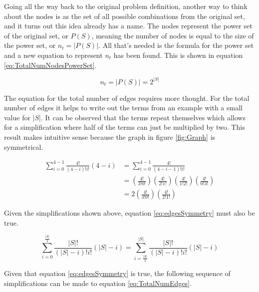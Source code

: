 \documentclass{article}
\begin{document}
Going all the way back to the original problem definition, another way to think about the nodes is as the set of all possible combinations from the original set, and it turns out this idea already has a name. The nodes represent the power set of the original set, or $P(S)$, meaning the number of nodes is equal to the size of the power set, or $n_t=|P(S)|$. All that's needed is the formula for the power set and a new equation to represent $n_t$ has been found. This is shown in equation \ref{eq:TotalNumNodesPowerSet}.

\begin{equation}
    n_t=|P(S)|=2^{|S|}
    \label{eq:TotalNumNodesPowerSet}
\end{equation}

The equation for the total number of edges requires more thought. For the total number of edges it helps to write out the terms from an example with a small value for $|S|$. It can be observed that the terms repeat themselves which allows for a simplification where half of the terms can just be multiplied by two. This result makes intuitive sense because the graph in figure \ref{fig:Graph} is symmetrical.

\begin{equation*}
    \begin{split}
        \sum_{i=0}^{4-1}\frac{4!}{(4-i)!i!}(4-i)&=
        \sum_{i=0}^{4-1}\frac{4!}{(4-i-1)!i!}
        \\
        &=
        \left(\frac{4!}{3!0!}\right)
        \left(\frac{4!}{2!1!}\right)
        \left(\frac{4!}{1!2!}\right)
        \left(\frac{4!}{0!3!}\right)
        \\
        &=
        2
        \left(\frac{4!}{3!0!}\right)
        \left(\frac{4!}{2!1!}\right)
    \end{split}
\end{equation*}

Given the simplifications shown above, equation \ref{eq:edgesSymmetry} must also be true.

\begin{equation}
    \sum_{i=0}^{\frac{|S|}{2}}\frac{|S|!}{(|S|-i)!i!}\left(|S|-i\right)=
    \sum_{i=\frac{|S|}{2}}^{|S|}\frac{|S|!}{(|S|-i)!i!}\left(|S|-i\right)
    \label{eq:edgesSymmetry}
\end{equation}

Given that equation \ref{eq:edgesSymmetry} is true, the following sequence of simplifications can be made to equation \ref{eq:TotalNumEdges}.
\end{document}
